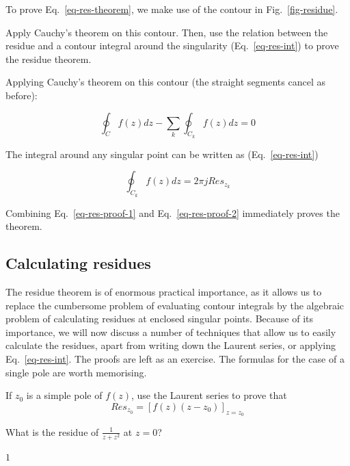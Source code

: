To prove Eq.~\ref{eq-res-theorem}, we make use of the contour in Fig.~\ref{fig-residue}.

\begin{cue}
  Apply Cauchy's theorem on this contour. Then, use the relation between the residue and a contour integral around the singularity (Eq.~\ref{eq-res-int}) to prove the residue theorem. 
\end{cue}

Applying Cauchy's theorem on this contour (the straight segments cancel as before):

\begin{equation}
\oint_{{C}} f(z) dz - \sum_k \oint_{{C}_k} f(z) dz = 0
\label{eq-res-proof-1}
\end{equation}

The integral around any singular point can be written as (Eq.~\ref{eq-res-int})

\begin{equation}
\oint_{{C}_k} f(z) dz = 2 \pi j Res_{z_k} \label{eq-res-proof-2}
\end{equation} 

Combining Eq.~\ref{eq-res-proof-1} and Eq.~\ref{eq-res-proof-2} immediately proves the theorem.

\subsection*{Calculating residues}

The residue theorem is of enormous practical importance, as it allows us to replace the cumbersome problem of evaluating contour integrals by the algebraic problem of calculating residues at enclosed singular points. Because of its importance, we will now discuss a number of techniques that allow us to easily calculate the residues, apart from writing down the Laurent series, or applying Eq.~\ref{eq-res-int}. The proofs are left as an exercise. The formulas for the case of a single pole are worth memorising.

\begin{exer}
  If $z_0$ is a simple pole of $f(z)$, use the Laurent series to prove that
$$Res_{z_0} = \left[f(z)(z-z_0)\right]_{z=z_0}$$
\label{ex-res1}
\end{exer}

\begin{exer}
What is the residue of $\frac{1}{z+z^2}$ at $z=0$?
\begin{sol}
  $1$
\end{sol}
\end{exer}

